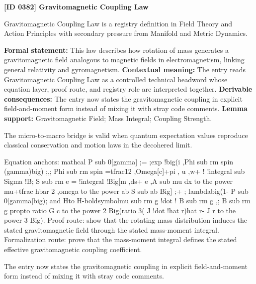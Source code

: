 \clearpage
\noindent\textbf{[ID 0382] Gravitomagnetic Coupling Law}\par
\vspace{0.35em}
\begingroup\small
{}
Gravitomagnetic Coupling Law is a registry definition in Field Theory and Action Principles with secondary pressure from Manifold and Metric Dynamics.

\begingroup\footnotesize\setlength{\emergencystretch}{3em}\sloppy
\textbf{Formal statement:} This law describes how rotation of mass generates a gravitomagnetic field analogous to magnetic fields in electromagnetism, linking general relativity and gyromagnetism. \textbf{Contextual meaning:} The entry reads Gravitomagnetic Coupling Law as a controlled technical headword whose equation layer, proof route, and registry role are interpreted together. \textbf{Derivable consequences:} The entry now states the gravitomagnetic coupling in explicit field-and-moment form instead of mixing it with stray code comments. \textbf{Lemma support:} Gravitomagnetic Field; Mass Integral; Coupling Strength.\par
\endgroup

The micro-to-macro bridge is valid when quantum expectation values reproduce classical conservation and motion laws in the decohered limit.

Equation anchors: mathcal P sub 0[gamma] ;= ;exp !big(i ,Phi sub rm spin (gamma)big) ;,; Phi sub rm spin =tfrac12 ,Omega[c]+pi , u ,w+ ! !integral sub Sigma !B; S sub rm e = !integral !Big[m ,ds+ e ,A sub mu dx to the power mu+tfrac hbar 2 ,omega to the power ab S sub ab Big] ;+ ; lambdabig(1- P sub 0[gamma]big); and Hto H-boldsymbolmu sub rm g !dot ! B sub rm g ,; B sub rm g propto ratio G c to the power 2 Big(ratio 3( J !dot !hat r)hat r- J r to the power 3 Big). Proof route: show that the rotating mass distribution induces the stated gravitomagnetic field through the stated mass-moment integral. Formalization route: prove that the mass-moment integral defines the stated effective gravitomagnetic coupling coefficient.

The entry now states the gravitomagnetic coupling in explicit field-and-moment form instead of mixing it with stray code comments.
\endgroup


